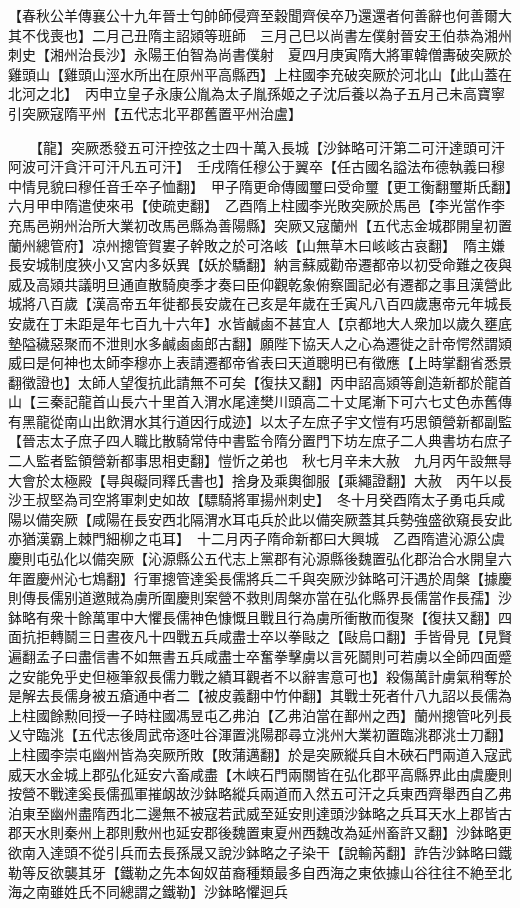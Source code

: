 【春秋公羊傳襄公十九年晉士匄帥師侵齊至穀聞齊侯卒乃還還者何善辭也何善爾大其不伐喪也】二月己丑隋主詔熲等班師　三月己巳以尚書左僕射晉安王伯恭為湘州刺史【湘州治長沙】永陽王伯智為尚書僕射　夏四月庚寅隋大將軍韓僧夀破突厥於雞頭山【雞頭山涇水所出在原州平高縣西】上柱國李充破突厥於河北山【此山蓋在北河之北】　丙申立皇子永康公胤為太子胤孫姬之子沈后養以為子五月己未高寶寧引突厥寇隋平州【五代志北平郡舊置平州治盧】

　　【龍】突厥悉發五可汗控弦之士四十萬入長城【沙鉢略可汗第二可汗達頭可汗阿波可汗貪汗可汗凡五可汗】　壬戌隋任穆公于翼卒【任古國名謚法布德執義曰穆中情見貌曰穆任音壬卒子恤翻】　甲子隋更命傳國璽曰受命璽【更工衡翻璽斯氏翻】六月甲申隋遣使來弔【使疏吏翻】　乙酉隋上柱國李光敗突厥於馬邑【李光當作李充馬邑朔州治所大業初改馬邑縣為善陽縣】突厥又寇蘭州【五代志金城郡開皇初置蘭州總管府】凉州摠管賀婁子幹敗之於可洛峐【山無草木曰峐峐古哀翻】　隋主嫌長安城制度狹小又宮内多妖異【妖於驕翻】納言蘇威勸帝遷都帝以初受命難之夜與威及高熲共議明旦通直散騎庾季才奏曰臣仰觀乾象俯察圖記必有遷都之事且漢營此城將八百歲【漢高帝五年徙都長安歲在己亥是年歲在壬寅凡八百四歲惠帝元年城長安歲在丁未距是年七百九十六年】水皆鹹鹵不甚宜人【京都地大人衆加以歲久壅底墊隘穢惡聚而不泄則水多鹹鹵鹵郎古翻】願陛下協天人之心為遷徙之計帝愕然謂熲威曰是何神也太師李穆亦上表請遷都帝省表曰天道聰明已有徵應【上時掌翻省悉景翻徵證也】太師人望復抗此請無不可矣【復扶又翻】丙申詔高熲等創造新都於龍首山【三秦記龍首山長六十里首入渭水尾達樊川頭高二十丈尾漸下可六七丈色赤舊傳有黑龍從南山出飲渭水其行道因行成迹】以太子左庶子宇文愷有巧思領營新都副監【晉志太子庶子四人職比散騎常侍中書監令隋分置門下坊左庶子二人典書坊右庶子二人監者監領營新都事思相吏翻】愷忻之弟也　秋七月辛未大赦　九月丙午設無㝵大會於太極殿【㝵與礙同釋氏書也】捨身及乘輿御服【乘繩證翻】大赦　丙午以長沙王叔堅為司空將軍刺史如故【驃騎將軍揚州刺史】　冬十月癸酉隋太子勇屯兵咸陽以備突厥【咸陽在長安西北隔渭水耳屯兵於此以備突厥蓋其兵勢強盛欲窺長安此亦猶漢霸上棘門細柳之屯耳】　十二月丙子隋命新都曰大興城　乙酉隋遣沁源公虞慶則屯弘化以備突厥【沁源縣公五代志上黨郡有沁源縣後魏置弘化郡治合水開皇六年置慶州沁七鴆翻】行軍摠管達奚長儒將兵二千與突厥沙鉢略可汗遇於周槃【據慶則傳長儒别道邀賊為虜所圍慶則案營不救則周槃亦當在弘化縣界長儒當作長孺】沙鉢略有衆十餘萬軍中大懼長儒神色慷慨且戰且行為虜所衝散而復聚【復扶又翻】四面抗拒轉鬬三日晝夜凡十四戰五兵咸盡士卒以拳敺之【敺烏口翻】手皆骨見【見賢遍翻孟子曰盡信書不如無書五兵咸盡士卒奮拳擊虜以言死鬬則可若虜以全師四面蹙之安能免乎史但極筆叙長儒力戰之績耳觀者不以辭害意可也】殺傷萬計虜氣稍奪於是解去長儒身被五瘡通中者二【被皮義翻中竹仲翻】其戰士死者什八九詔以長儒為上柱國餘勲囘授一子時柱國馮昱屯乙弗泊【乙弗泊當在鄯州之西】蘭州摠管叱列長乂守臨洮【五代志後周武帝逐吐谷渾置洮陽郡尋立洮州大業初置臨洮郡洮士刀翻】上柱國李崇屯幽州皆為突厥所敗【敗蒲邁翻】於是突厥縱兵自木硤石門兩道入寇武威天水金城上郡弘化延安六畜咸盡【木峡石門兩關皆在弘化郡平高縣界此由虞慶則按營不戰達奚長儒孤軍摧衂故沙鉢略縱兵兩道而入然五可汗之兵東西齊舉西自乙弗泊東至幽州盡隋西北二邊無不被寇若武威至延安則達頭沙鉢略之兵耳天水上郡皆古郡天水則秦州上郡則敷州也延安郡後魏置東夏州西魏改為延州畜許又翻】沙鉢略更欲南入達頭不從引兵而去長孫晟又說沙鉢略之子染干【說輸芮翻】詐告沙鉢略曰鐵勒等反欲襲其牙【鐵勒之先本匈奴苗裔種類最多自西海之東依據山谷往往不絶至北海之南雖姓氏不同總謂之鐵勒】沙鉢略懼迴兵